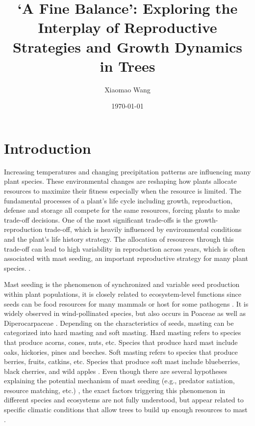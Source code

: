 \documentclass[11pt,letter]{article}
\begin{document}
\title{`A Fine Balance': Exploring the Interplay of Reproductive Strategies and Growth Dynamics in Trees}
\author{Xiaomao Wang} 
\date{\today}
\maketitle

\setlength{\parindent}{0pt}
\setlength{\parskip}{3pt}

\section{Introduction} 
Increasing temperatures and changing precipitation patterns are influencing many plant species. These environmental changes are reshaping how plants allocate resources to maximize their fitness especially when the resource is limited. The fundamental processes of a plant's life cycle including growth, reproduction, defense and storage all compete for the same resources, forcing plants to make trade-off decisions. One of the most significant trade-offs is the growth-reproduction trade-off, which is heavily influenced by environmental conditions and the plant's life history strategy. The allocation of resources through this trade-off can lead to high variability in reproduction across years, which is often associated with mast seeding, an important reproductive strategy for many plant species. \citep{pearse2016mechanisms}.\par
Mast seeding is the phenomenon of synchronized and variable seed production within plant populations, it is closely related to ecosystem-level functions since seeds can be food resources for many mammals or host for some pathogens  \citep{janzen1971seed, kelly1994evolutionary, davies2024seed}. It is widely observed in wind-pollinated species, but also occurs in Poaceae as well as Diperocarpaceae \citep{kelly2002mast}. Depending on the characteristics of seeds, masting can be categorized into hard masting and soft masting. Hard masting refers to species that produce acorns, cones, nuts, etc. Species that produce hard mast include oaks, hickories, pines and beeches. Soft masting refers to species that produce berries, fruits, catkins, etc. Species that produce soft mast include blueberries, black cherries, and wild apples \citep{harmon1989mast}. Even though there are several hypotheses explaining the potential mechanism of mast seeding (e.g., predator satiation, resource matching, etc.)  \citep{koenig2021brief}, the exact factors triggering this phenomenon in different species and ecosystems are not fully understood, but appear related to specific climatic conditions that allow trees to build up enough resources to mast  \citep{pearse2016mechanisms}. \par
\end{document}

